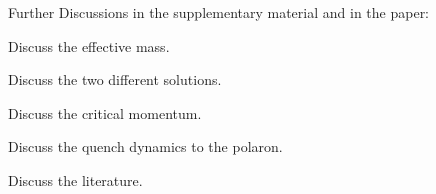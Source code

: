 \documentclass[twocolumn,amsmath,amssymb,showpacs,prl,superscriptaddress,aps]{revtex4-1}
\begin{document}
Further Discussions in the supplementary material and in the paper: 

Discuss the effective mass.

Discuss the two different solutions. 

Discuss the critical momentum. 

Discuss the quench dynamics to the polaron. 

Discuss the literature.





 
\end{document}
